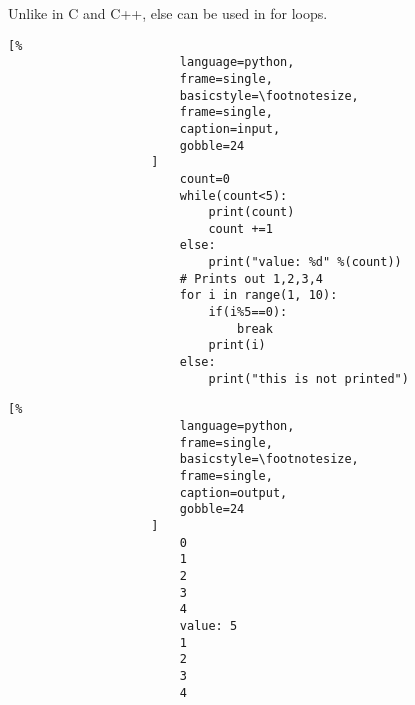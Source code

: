 \documentclass[crop=false,class=article,oneside]{standalone}
\begin{document}
                Unlike in C and C++, else can be used in for
                loops.\newline
                \begin{minipage}[t]{.48\textwidth}
                    \centering
                    \begin{lstlisting}[%
                        language=python,
                        frame=single,
                        basicstyle=\footnotesize,
                        frame=single,
                        caption=input,
                        gobble=24
                    ]
                        count=0
                        while(count<5):
                            print(count)
                            count +=1
                        else:
                            print("value: %d" %(count))
                        # Prints out 1,2,3,4
                        for i in range(1, 10):
                            if(i%5==0):
                                break
                            print(i)
                        else:
                            print("this is not printed")
                    \end{lstlisting}
                \end{minipage}\hfill
                \begin{minipage}[t]{.48\textwidth}
                    \centering
                    \begin{lstlisting}[%
                        language=python,
                        frame=single,
                        basicstyle=\footnotesize,
                        frame=single,
                        caption=output,
                        gobble=24
                    ]
                        0
                        1
                        2
                        3
                        4
                        value: 5
                        1
                        2
                        3
                        4
                    \end{lstlisting}
                \end{minipage}
\end{document}

